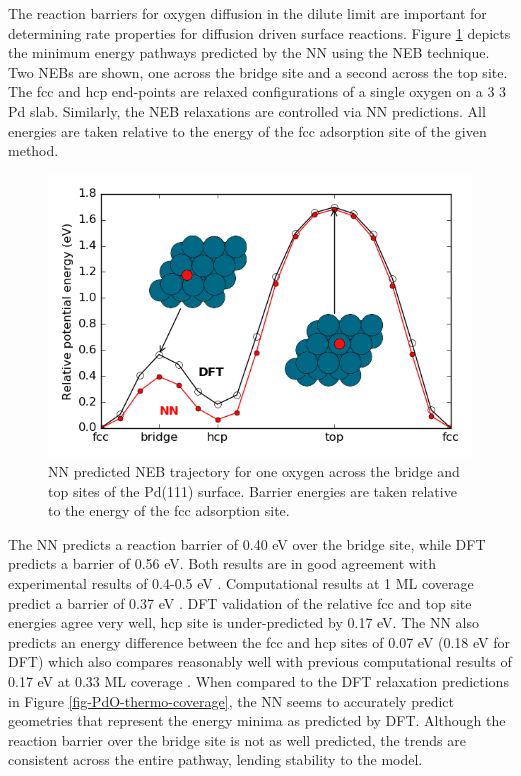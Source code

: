 \documentclass[12pt]{cmuthesis}
\begin{document}
The reaction barriers for oxygen diffusion in the dilute limit are important for determining rate properties for diffusion driven surface reactions. Figure \ref{fig-PdO1-NEB} depicts the minimum energy pathways predicted by the NN using the NEB technique. Two NEBs are shown, one across the bridge site and a second across the top site. The fcc and hcp end-points are relaxed configurations of a single oxygen on a 3 \texttimes{} 3 Pd slab. Similarly, the NEB relaxations are controlled via NN predictions. All energies are taken relative to the energy of the fcc adsorption site of the given method.

\begin{figure}[htbp]
\centering
\includegraphics[width=5in]{./images/PdO1-NEB.png}
\caption{\label{fig-PdO1-NEB}
NN predicted NEB trajectory for one oxygen across the bridge and top sites of the Pd(111) surface. Barrier energies are taken relative to the energy of the fcc adsorption site.}
\end{figure}

The NN predicts a reaction barrier of 0.40 eV over the bridge site, while DFT predicts a barrier of 0.56 eV. Both results are in good agreement with experimental results of 0.4-0.5 eV \cite{rose-2004-chemis-atomic}. Computational results at 1 ML coverage predict a barrier of 0.37 eV \cite{markovits-2008-move-stron}. DFT validation of the relative fcc and top site energies agree very well, hcp site is under-predicted by 0.17 eV. The NN also predicts an energy difference between the fcc and hcp sites of 0.07 eV (0.18 eV for DFT) which also compares reasonably well with previous computational results of 0.17 eV at 0.33 ML coverage \cite{honkala-2001-ab-initio}. When compared to the DFT relaxation predictions in Figure \ref{fig-PdO-thermo-coverage}, the NN seems to accurately predict geometries that represent the energy minima as predicted by DFT. Although the reaction barrier over the bridge site is not as well predicted, the trends are consistent across the entire pathway, lending stability to the model.
\end{document}

